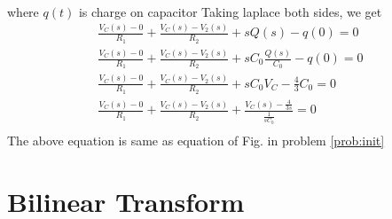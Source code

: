 \documentclass[journal,12pt,twocolumn]{IEEEtran}
\renewcommand\thesection{\arabic{section}}
\begin{document}
\begin{enumerate}[label=\arabic*.,ref=\thesection.\theenumi]
\begin{align}
			\end{align}
where $q(t)$ is charge on capacitor
Taking laplace both sides, we get
\begin{align}
	\frac{V_{C}(s)-0}{R_1}+\frac{V_{C}(s)-V_{2}(s)}{R_2}+sQ(s)-q(0)=0\\
	\frac{V_{C}(s)-0}{R_1}+\frac{V_{C}(s)-V_{2}(s)}{R_2}+sC_0\frac{Q(s)}{C_0}-q(0)=0\\
	\frac{V_{C}(s)-0}{R_1}+\frac{V_{C}(s)-V_{2}(s)}{R_2}+sC_0V_{C}-\frac{4}{3}C_0=0\\
	\frac{V_{C}(s)-0}{R_1}+\frac{V_{C}(s)-V_{2}(s)}{R_2}+\frac{V_{C}(s)-\frac{4}{3s}}{\frac{1}{sC_0}}=0\\
\end{align}
The above equation is same as equation of Fig. in problem 
		\ref{prob:init}
	\end{enumerate}
 \section{Bilinear Transform}
\end{document}
